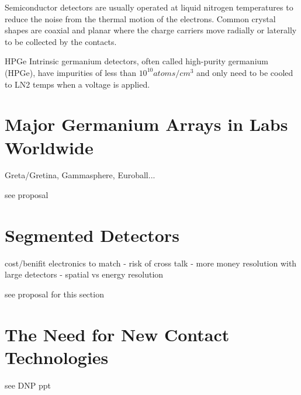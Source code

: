 Semiconductor detectors are usually operated at liquid nitrogen temperatures to reduce the noise from the thermal motion of the electrons. Common crystal shapes are coaxial and planar where the charge carriers move radially or laterally to be collected by the contacts. 

HPGe
Intrinsic germanium detectors, often called high-purity germanium (HPGe), have impurities of less than $10^10 atoms/cm^3$ and only need to be cooled to LN2 temps when a voltage is applied. 

\section{Major Germanium Arrays in Labs Worldwide}
\indent Greta/Gretina, Gammasphere, Euroball...

see proposal

\section{Segmented Detectors}
\indent cost/benifit
electronics to match - risk of cross talk - more money
resolution with large detectors - spatial vs energy resolution

see proposal for this section
 
\section{The Need for New Contact Technologies}
\indent 

see DNP ppt

 